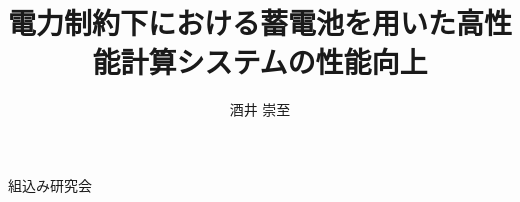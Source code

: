 \documentclass[ipc]{suribt}
\title{電力制約下における蓄電池を用いた高性能計算システムの性能向上}
\author{酒井 崇至}
\begin{document}
\maketitle%

\frontmatter%
\begin{abstract}%

\end{abstract}

\tableofcontents%

\mainmatter%










\backmatter%


\begin{thepublication}{9}
組込み研究会
\end{thepublication}

\appendix%
\chapter{}
\end{document}
